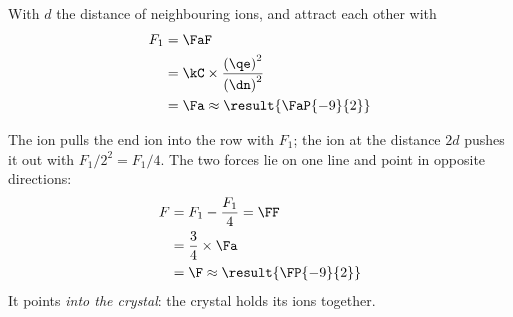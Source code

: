 \begin{abcliste}
\abc With $d$ the distance of neighbouring ions,  and  attract each other with
\begin{align}
 F_1 &= \FaF \\
   &= \kC\times\frac{\left(\qe\right)^2}{\left(\dn\right)^2} \\
   &= \Fa \approx \result{\FaP{-9}{2}}
\end{align}

\abc
\begin{center}
\end{center}
The  ion pulls the end ion into the row with $F_1$; the  ion at the distance $2d$ pushes it out with $F_1/2^2 = F_1/4$. The two forces lie on one line and point in opposite directions:
\begin{align}
 F &= F_1 - \frac{F_1}{4} = \FF \\
   &= \frac{3}{4}\times\Fa \\
   &= \F \approx \result{\FP{-9}{2}}
\end{align}
It points \emph{into the crystal}: the crystal holds its ions together.
\end{abcliste}
